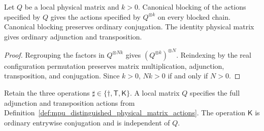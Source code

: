 \begin{lemma}
    \label{lem:mpu_physical_matrix_canonical_blocking}
    \leanok
    Let $Q$ be a local physical matrix and $k>0$. Canonical blocking of
    the actions specified by $Q$ gives the actions specified by
    $Q^{\otimes k}$ on every blocked chain. Canonical blocking preserves
    ordinary conjugation. The identity physical matrix gives ordinary
    adjunction and transposition.
\end{lemma}

\begin{proof}\leanok
    Regrouping the factors in $Q^{\otimes Nk}$ gives
    $(Q^{\otimes k})^{\otimes N}$. Reindexing by the real configuration
    permutation preserves matrix multiplication, adjunction, transposition,
    and conjugation. Since $k>0$, $Nk>0$ if and only if $N>0$.
\end{proof}

\begin{definition}
    \label{def:mpu_physical_matrix_symmetry_operations}
    \leanok
    Retain the three operations $\sharp\in\{\dagger,\mathsf T,\mathsf K\}$.
    A local matrix $Q$ specifies the full adjunction and transposition
    actions from Definition~\ref{def:mpu_distinguished_physical_matrix_actions}.
    The operation $\mathsf K$ is ordinary entrywise conjugation and is
    independent of $Q$.
\end{definition}

